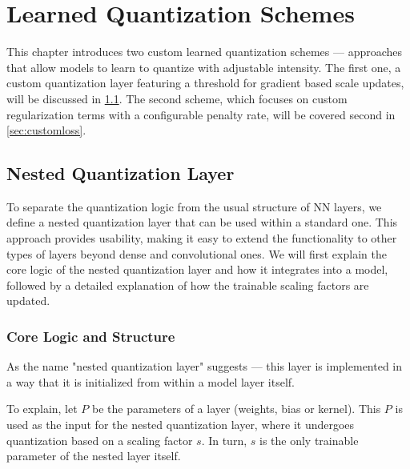 \chapter{Learned Quantization\label{cha:chapter3} Schemes}
\hspace*{1em}This chapter introduces two custom learned quantization schemes — approaches that allow models to learn to quantize
with adjustable intensity. The first one, a custom quantization layer featuring a threshold for gradient based scale updates,
will be discussed in \cref{sec:nestedquantizationlayer}. The second scheme, which focuses on custom regularization terms with a configurable penalty rate,
will be covered second in \cref{sec:customloss}.


\section{Nested Quantization Layer}
\label{sec:nestedquantizationlayer}
\hspace*{1em}To separate the quantization logic from the usual structure of NN layers,
we define a nested quantization layer that can be used within a standard one. 
This approach provides usability, making it easy to extend the functionality to other types of layers beyond dense and convolutional ones.
We will first explain the core logic of the nested quantization layer and how it integrates into a model,
followed by a detailed explanation of how the trainable scaling factors are updated.



\subsection{Core Logic and Structure}
\label{subsec:corelogicandstructure}

\hspace*{1em}As the name "nested quantization layer" suggests —
this layer is implemented in a way that it is initialized from within a model layer itself.

To explain, let \( P \) be the parameters of a layer (weights, bias or kernel). This \( P \) is used
as the input for the nested quantization layer, where it undergoes quantization based on 
a scaling factor \( s \). In turn, \( s \) is the only trainable parameter of the nested layer itself.

